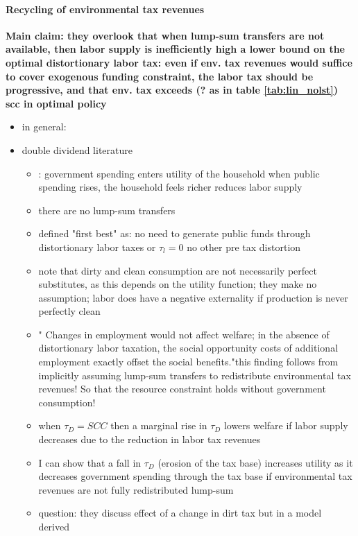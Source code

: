 \paragraph{Recycling of environmental tax revenues}
\textbf{Main claim: they overlook that when lump-sum transfers are not available, then labor supply is inefficiently high \ar a lower bound on the optimal distortionary labor tax: even if env. tax revenues would suffice to cover exogenous funding constraint, the labor tax should be progressive, and that env. tax exceeds (? as in table \ref{tab:lin_nolst}) scc in optimal policy}
\begin{itemize}
	\item in general: \cite{Fried2018TheGenerations}
	\item double dividend literature
	\begin{itemize}
		\item \cite{LansBovenberg1994EnvironmentalTaxation}: government spending enters utility of the household \ar when public spending rises, the household feels richer \ar reduces labor supply
		\item there are no lump-sum transfers
		\item defined "first best" as: no need to generate public funds through distortionary labor taxes or $\tau_l=0$ no other pre tax distortion
		\item note that dirty and clean consumption are not necessarily perfect substitutes, as this depends on the utility function; they make no assumption; \ar labor does have a negative externality if production is never perfectly clean
		\item " Changes in employment would not affect welfare; in the absence of distortionary labor taxation, the social opportunity costs of additional employment exactly offset the social benefits."\ar this finding follows from implicitly assuming lump-sum transfers to redistribute environmental tax revenues! So that the resource constraint holds without government consumption! 
		\item when $\tau_D=SCC$ then a marginal rise in $\tau_D$ lowers welfare if labor supply decreases due to the reduction in labor tax revenues
		\item I can show that a fall in $\tau_D$ (erosion of the tax base) increases utility as it decreases government spending through the tax base if environmental tax revenues are not fully redistributed lump-sum 
		\item question: they discuss effect of a change in dirt tax but in a model derived
	\end{itemize} \citep{Barrage2019OptimalPolicy}
\end{itemize}
